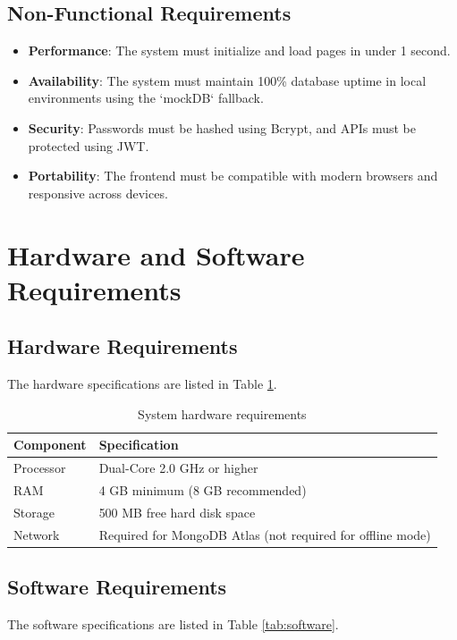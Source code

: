 \documentclass[12pt,a4paper]{report}
\begin{document}
\subsection{Non-Functional Requirements}
\begin{itemize}
    \item \textbf{Performance}: The system must initialize and load pages in under 1 second.
    \item \textbf{Availability}: The system must maintain 100\% database uptime in local environments using the `mockDB` fallback.
    \item \textbf{Security}: Passwords must be hashed using Bcrypt, and APIs must be protected using JWT.
    \item \textbf{Portability}: The frontend must be compatible with modern browsers and responsive across devices.
\end{itemize}

\section{Hardware and Software Requirements}
\subsection{Hardware Requirements}
The hardware specifications are listed in Table \ref{tab:hardware}.

\begin{table}[h!]
\centering
\begin{tabular}{|p{4cm}|p{9cm}|}
\hline
\textbf{Component} & \textbf{Specification} \\
\hline
Processor & Dual-Core 2.0 GHz or higher \\
\hline
RAM & 4 GB minimum (8 GB recommended) \\
\hline
Storage & 500 MB free hard disk space \\
\hline
Network & Required for MongoDB Atlas (not required for offline mode) \\
\hline
\end{tabular}
\caption{System hardware requirements}
\label{tab:hardware}
\end{table}

\subsection{Software Requirements}
The software specifications are listed in Table \ref{tab:software}.
\end{document}
